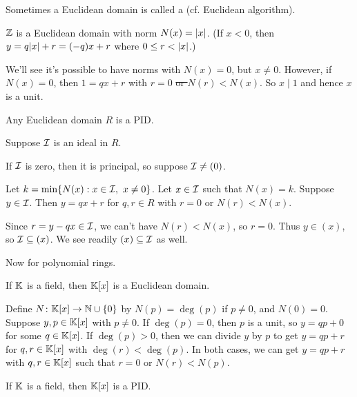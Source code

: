 \documentclass[12pt,letterpaper]{report}
\begin{document}
Sometimes a Euclidean domain is called a  (cf. Euclidean
algorithm).

\begin{ex}
  $\mathbb{Z}$ is a Euclidean domain with norm $N(x) = \lvert x\rvert$.
  (If $x < 0$, then $y = q\lvert x\rvert + r = (-q)x + r$ where $0 \leq r < \lvert x\rvert$.)
\end{ex}

We'll see it's possible to have norms with $N(x) = 0$, but $x \neq 0$.
However, if $N(x) = 0$, then $1 = qx + r$ with $r = 0$ \sout{or $N(r) < N(x)$}.
So $x \mid 1$ and hence $x$ is a unit.

\begin{prop}{}{}
  Any Euclidean domain $R$ is a PID.
\end{prop}

\begin{thmproof}
  Suppose $\mathcal{I}$ is an ideal in $R$.

  If $\mathcal{I}$ is zero, then it is principal, so suppose $\mathcal{I} \neq (0)$.

  Let $k = \min\{N(x) : x \in \mathcal{I}, \ x \neq 0\}$.
  Let $x \in \mathcal{I}$ such that $N(x) = k$.
  Suppose $y \in \mathcal{I}$.
  Then $y = qx + r$ for $q, r \in R$ with $r = 0$ or $N(r) < N(x)$.

  Since $r = y - qx \in \mathcal{I}$, we can't have $N(r) < N(x)$, so $r = 0$.
  Thus $y \in (x)$, so $\mathcal{I} \subseteq (x)$.
  We see readily $(x) \subseteq \mathcal{I}$ as well.
\end{thmproof}

Now for polynomial rings.

\begin{prop}{}{}
  If $\mathbb{K}$ is a field, then $\mathbb{K}[x]$ is a Euclidean domain.
\end{prop}

\begin{thmproof}
  Define $N \colon \mathbb{K}[x] \to \mathbb{N} \cup \{0\}$ by $N(p) = \deg(p)$ if $p \neq 0$, and $N(0) = 0$.
  Suppose $y, p \in \mathbb{K}[x]$ with $p \neq 0$.
  If $\deg(p) = 0$, then $p$ is a unit, so $y = qp + 0$ for some $q \in \mathbb{K}[x]$.
  If $\deg(p) > 0$, then we can divide $y$ by $p$ to get $y = qp + r$ for $q, r \in \mathbb{K}[x]$ with
  $\deg(r) < \deg(p)$.
  In both cases, we can get $y = qp + r$ with $q, r \in \mathbb{K}[x]$ such that $r = 0$ or $N(r) < N(p)$.
\end{thmproof}

\begin{cor}{}{}
  If $\mathbb{K}$ is a field, then $\mathbb{K}[x]$ is a PID.
\end{cor}
\end{document}
